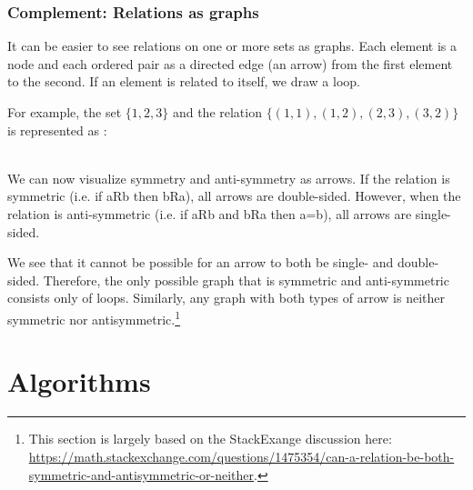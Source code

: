 \documentclass[10pt,a4paper]{book}
\begin{document}
\section{Complement: Relations as graphs}
It can be easier to see relations on one or more sets as graphs. Each element is a node and each ordered pair as a directed edge (an arrow) from the first element to the second. If an element is related to itself, we draw a loop.\par 
For example, the set $\{1,2,3\}$ and the relation $\{(1,1),(1,2),(2,3),(3,2)\}$ is represented as :\par
{} \\
We can now visualize symmetry and anti-symmetry as arrows. If the relation is symmetric (i.e. if aRb then bRa), all arrows are double-sided. However, when the relation is anti-symmetric (i.e. if aRb and bRa then a=b), all arrows are single-sided. \par 
We see that it cannot be possible for an arrow to both be single- and double-sided. Therefore, the only possible graph that is symmetric and anti-symmetric consists only of loops. Similarly, any graph with both types of arrow is neither symmetric nor antisymmetric.\footnote{This section is largely based on the StackExange discussion here: \url{https://math.stackexchange.com/questions/1475354/can-a-relation-be-both-symmetric-and-antisymmetric-or-neither}.}

\part{Algorithms}
\end{document}
